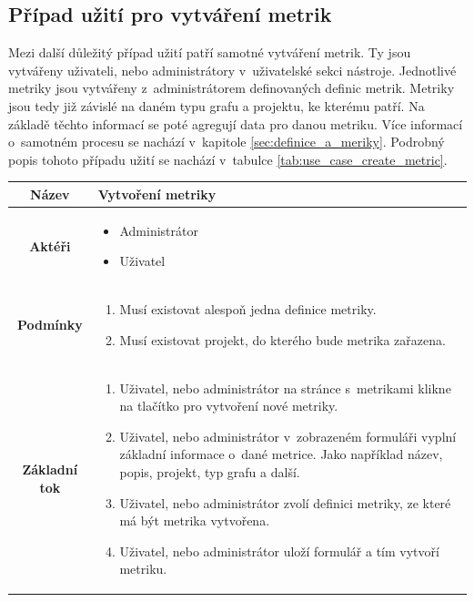\documentclass[czech,master]{diploma}
\begin{document}
\subsection{Případ užití pro vytváření metrik}
Mezi další důležitý případ užití patří samotné vytváření metrik. Ty jsou vytvářeny uživateli, nebo administrátory v~uživatelské sekci nástroje. Jednotlivé metriky jsou vytvářeny z~administrátorem definovaných definic metrik. Metriky jsou tedy již závislé na daném typu grafu a projektu, ke kterému patří. Na základě těchto informací se poté agregují data pro danou metriku. Více informací o~samotném procesu se nachází v~kapitole \ref{sec:definice_a_meriky}. Podrobný popis tohoto případu užití se nachází v~tabulce \ref{tab:use_case_create_metric}.

\begin{table}[htp]
\begin{center}
\begin{tabular}{c | m{10cm}}

\textbf{Název} & Vytvoření metriky \\ 
\hline
\textbf{Aktéři} & 
\begin{itemize}
\item Administrátor
\item Uživatel
\end{itemize}
\\ 
\hline
\textbf{Podmínky} & 
\begin{enumerate}
\item Musí existovat alespoň jedna definice metriky.
\item Musí existovat projekt, do kterého bude metrika zařazena.
\end{enumerate}
 
\\ 
\hline
\textbf{Základní tok} &                                                                              
\begin{enumerate}
\item Uživatel, nebo administrátor na stránce s~metrikami klikne na tlačítko pro vytvoření nové metriky.
\item Uživatel, nebo administrátor v~zobrazeném formuláři vyplní základní informace o~dané metrice. Jako například název, popis, projekt, typ grafu a další.
\item Uživatel, nebo administrátor zvolí definici metriky, ze které má být metrika vytvořena.
\item Uživatel, nebo administrátor uloží formulář a tím vytvoří metriku.
\end{enumerate}
\\ 
\hline


\end{tabular}
\end{center}
\end{table}
\end{document}
